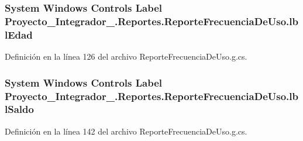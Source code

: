 \hypertarget{class_proyecto___integrador__3_1_1_reportes_1_1_reporte_frecuencia_de_uso_aaa51d4046ba0f85ed3aebb8261a30d5e}{
\subsubsection[{lbl\-Edad}]{\setlength{\rightskip}{0pt plus 5cm}System Windows Controls Label Proyecto\-\_\-\-Integrador\-\_.\-Reportes.\-Reporte\-Frecuencia\-De\-Uso.\-lbl\-Edad\hspace{0.3cm}{\ttfamily [package]}}}\label{class_proyecto___integrador__3_1_1_reportes_1_1_reporte_frecuencia_de_uso_aaa51d4046ba0f85ed3aebb8261a30d5e}


Definición en la línea 126 del archivo Reporte\-Frecuencia\-De\-Uso.\-g.\-cs.

\hypertarget{class_proyecto___integrador__3_1_1_reportes_1_1_reporte_frecuencia_de_uso_a6cd14267e6c8f8bd3ad6396122576187}{
\subsubsection[{lbl\-Saldo}]{\setlength{\rightskip}{0pt plus 5cm}System Windows Controls Label Proyecto\-\_\-\-Integrador\-\_.\-Reportes.\-Reporte\-Frecuencia\-De\-Uso.\-lbl\-Saldo\hspace{0.3cm}{\ttfamily [package]}}}\label{class_proyecto___integrador__3_1_1_reportes_1_1_reporte_frecuencia_de_uso_a6cd14267e6c8f8bd3ad6396122576187}


Definición en la línea 142 del archivo Reporte\-Frecuencia\-De\-Uso.\-g.\-cs.

